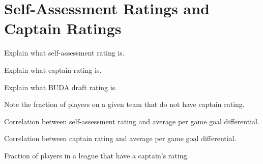 \section{Self-Assessment Ratings and Captain Ratings}\label{sec:self_rating}

Explain what self-assessment rating is.

Explain what captain rating is.

Explain what BUDA draft rating is.

Note the fraction of players on a given team that do not have captain rating.

Correlation between self-assessment rating and average per game goal differential.

Correlation between captain rating and average per game goal differential.

Fraction of players in a league that have a captain's rating.